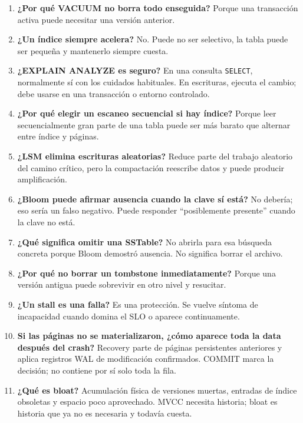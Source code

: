 \documentclass[variant=docente,cover=institutional,mode=screen]{ua-engineering-v6-article}
\begin{document}
\begin{enumerate}
\item \textbf{¿Por qué VACUUM no borra todo enseguida?} Porque una transacción activa puede necesitar una versión anterior.

\item \textbf{¿Un índice siempre acelera?} No. Puede no ser selectivo, la tabla puede ser pequeña y mantenerlo siempre cuesta.

\item \textbf{¿EXPLAIN ANALYZE es seguro?} En una consulta \texttt{SELECT}, normalmente sí con los cuidados habituales. En escrituras, ejecuta el cambio; debe usarse en una transacción o entorno controlado.

\item \textbf{¿Por qué elegir un escaneo secuencial si hay índice?} Porque leer secuencialmente gran parte de una tabla puede ser más barato que alternar entre índice y páginas.

\item \textbf{¿LSM elimina escrituras aleatorias?} Reduce parte del trabajo aleatorio del camino crítico, pero la compactación reescribe datos y puede producir amplificación.

\item \textbf{¿Bloom puede afirmar ausencia cuando la clave sí está?} No debería; eso sería un falso negativo. Puede responder ``posiblemente presente'' cuando la clave no está.

\item \textbf{¿Qué significa omitir una SSTable?} No abrirla para esa búsqueda concreta porque Bloom demostró ausencia. No significa borrar el archivo.

\item \textbf{¿Por qué no borrar un tombstone inmediatamente?} Porque una versión antigua puede sobrevivir en otro nivel y resucitar.

\item \textbf{¿Un stall es una falla?} Es una protección. Se vuelve síntoma de incapacidad cuando domina el SLO o aparece continuamente.

\item \textbf{Si las páginas no se materializaron, ¿cómo aparece toda la data después del crash?} Recovery parte de páginas persistentes anteriores y aplica registros WAL de modificación confirmados. COMMIT marca la decisión; no contiene por sí solo toda la fila.

\item \textbf{¿Qué es bloat?} Acumulación física de versiones muertas, entradas de índice obsoletas y espacio poco aprovechado. MVCC necesita historia; bloat es historia que ya no es necesaria y todavía cuesta.


\end{enumerate}
\end{document}
